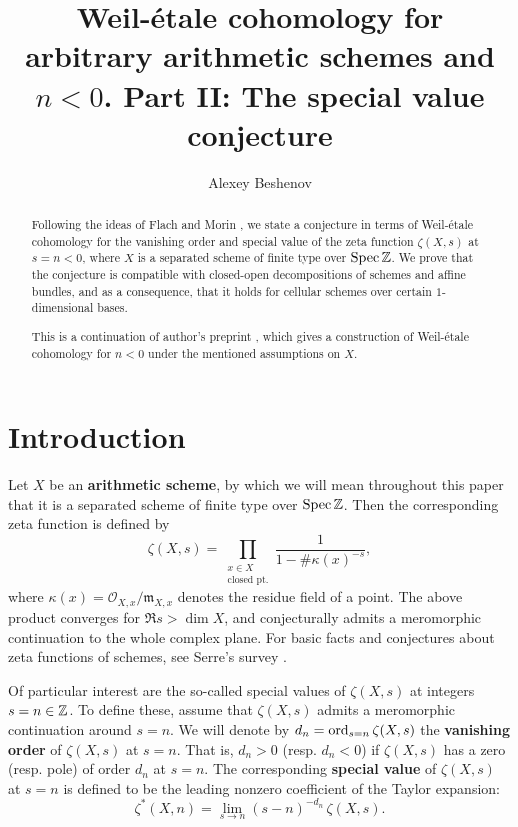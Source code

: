 \documentclass{article}
\title{Weil-étale cohomology for arbitrary arithmetic schemes and $n < 0$.
  Part II: The special value conjecture}
\author{Alexey Beshenov}
\numberwithin{equation}{section}
\begin{document}
\maketitle

\begin{abstract}
  Following the ideas of Flach and Morin \cite{Flach-Morin-2018}, we state a
  conjecture in terms of Weil-étale cohomology for the vanishing order and
  special value of the zeta function $\zeta (X,s)$ at $s = n < 0$, where $X$ is
  a separated scheme of finite type over $\operatorname{Spec} \mathbb{Z}$. We prove that the
  conjecture is compatible with closed-open decompositions of schemes and affine
  bundles, and as a consequence, that it holds for cellular schemes over certain
  $1$-dimensional bases.

  This is a continuation of author's preprint \cite{Beshenov-Weil-etale-1},
  which gives a construction of Weil-étale cohomology for $n<0$ under the
  mentioned assumptions on $X$.
\end{abstract}

\tableofcontents


\section{Introduction}

Let $X$ be an \textbf{arithmetic scheme}, by which we will mean throughout this
paper that it is a separated scheme of finite type over $\operatorname{Spec} \mathbb{Z}$. Then the
corresponding zeta function is defined by
\[ \zeta (X,s) = \prod_{\substack{x \in X \\ \text{closed pt.}}}
  \frac{1}{1 - \#\kappa (x)^{-s}}, \]
where $\kappa (x) = \mathcal{O}_{X,x}/\mathfrak{m}_{X,x}$ denotes the residue
field of a point. The above product converges for $\Re s > \dim X$, and
conjecturally admits a meromorphic continuation to the whole complex plane.
For basic facts and conjectures about zeta functions of schemes, see Serre's
survey \cite{Serre-1965}.

Of particular interest are the so-called special values of $\zeta (X,s)$ at
integers $s = n \in \mathbb{Z}$. To define these, assume that $\zeta (X,s)$ admits a
meromorphic continuation around $s = n$. We will denote by
$d_n = \operatorname{ord}_{s=n} \zeta (X,s)$ the \textbf{vanishing order} of $\zeta (X,s)$ at
$s = n$. That is, $d_n > 0$ (resp. $d_n < 0$) if $\zeta (X,s)$ has a zero
(resp. pole) of order $d_n$ at $s = n$. The corresponding \textbf{special value}
of $\zeta (X,s)$ at $s = n$ is defined to be the leading nonzero coefficient of
the Taylor expansion:
$$\zeta^* (X,n) = \lim_{s \to n} (s - n)^{-d_n}\,\zeta (X,s).$$
\end{document}
